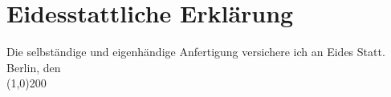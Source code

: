
\chapter*{Eidesstattliche Erkl\"{a}rung}
\thispagestyle{empty}
\vfill
Die selbst\"{a}ndige und eigenh\"{a}ndige Anfertigung versichere ich an Eides Statt.
\vspace{10pt}\\
Berlin, den
\vspace{10pt}\\
\line(1,0){200}
\clearpage




